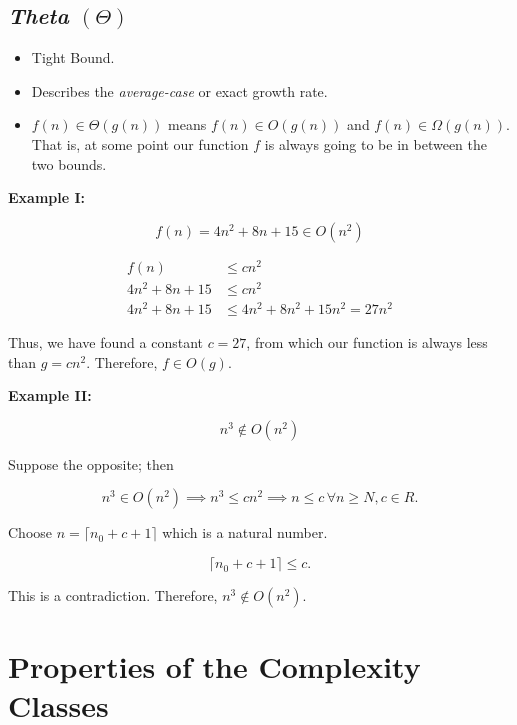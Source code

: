 \subsection{\emph{Theta} \texorpdfstring{\((\Theta)\)}{}} 

\begin{itemize}

    \item Tight Bound.

    \item Describes the \emph{average-case} or exact growth rate.

    \item \(f(n) \in \Theta(g(n))\) means \(f(n) \in O(g(n))\) and \(f(n) \in \Omega(g(n))\). 
          That is, at some point our function \(f\) is always going to be in between the two bounds.

\end{itemize}

\textbf{Example I:}

\[
    f(n) = 4n^2 + 8n + 15 \in O(n^2)
\]

\begin{align*}
    f(n) &\le c n^2 \\
    4n^2 + 8n + 15 &\le c n^2 \\
    4n^2 + 8n + 15 &\le 4n^2 + 8n^2 + 15n^2  = 27n^2
\end{align*}

Thus, we have found a constant \(c = 27\), from which our function is always less than \(g = c n^2\). 
Therefore, \(f \in O(g)\).

\QED

\textbf{Example II:}

\[
    n^3 \notin O(n^2)
\]

Suppose the opposite; then 

\[
    n^3 \in O(n^2) \implies n^3 \le c n^2 \implies n \le c \, \forall n \ge N, c \in R.
\]

Choose \(n = \lceil n_0 + c + 1 \rceil\) which is a natural number.

\[
    \lceil n_0 + c + 1 \rceil \le c.
\]

This is a contradiction. Therefore, \(n^3 \notin O(n^2)\).

\QED

\section{Properties of the Complexity Classes}

